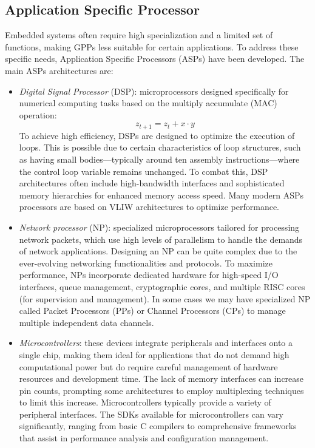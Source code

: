 \subsection{Application Specific Processor}
Embedded systems often require high specialization and a limited set of functions, making GPPs less suitable for certain applications. 
To address these specific needs, Application Specific Processors (ASPs) have been developed.
The main ASPs architectures are: 
\begin{itemize}
    \item \textit{Digital Signal Processor} (DSP): microprocessors designed specifically for numerical computing tasks based on the multiply accumulate (MAC) operation: 
        \[z_{t+1} = z_t + x \cdot y\]
        To achieve high efficiency, DSPs are designed to optimize the execution of loops. 
        This is possible due to certain characteristics of loop structures, such as having small bodies—typically around ten assembly instructions—where the control loop variable remains unchanged.
        To combat this, DSP architectures often include high-bandwidth interfaces and sophisticated memory hierarchies for enhanced memory access speed. 
        Many modern ASPs processors are based on VLIW architectures to optimize performance. 
    \item \textit{Network processor} (NP): specialized microprocessors tailored for processing network packets, which use high levels of parallelism to handle the demands of network applications.
        Designing an NP can be quite complex due to the ever-evolving networking functionalities and protocols. 
        To maximize performance, NPs incorporate dedicated hardware for high-speed I/O interfaces, queue management, cryptographic cores, and multiple RISC cores (for supervision and management).
        In some cases we may have specialized NP called Packet Processors (PPs) or Channel Processors (CPs) to manage multiple independent data channels. 
    \item \textit{Microcontrollers}: these devices integrate peripherals and interfaces onto a single chip, making them ideal for applications that do not demand high computational power but do require careful management of hardware resources and development time. 
        The lack of memory interfaces can increase pin counts, prompting some architectures to employ multiplexing techniques to limit this increase. 
        Microcontrollers typically provide a variety of peripheral interfaces. 
        The SDKs available for microcontrollers can vary significantly, ranging from basic C compilers to comprehensive frameworks that assist in performance analysis and configuration management.
\end{itemize}